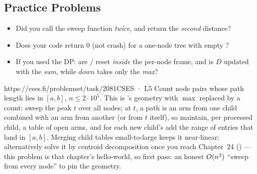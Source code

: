 \subsection{Practice Problems}

\begin{stuckbox}
\begin{itemize}[nosep, leftmargin=1.4em]
  \item Did you call the sweep function \emph{twice}, and return the \emph{second}
        distance?
  \item Does your code return $0$ (not crash) for a one-node tree with empty
        ?
  \item If you used the DP: are / reset \emph{inside} the per-node
        frame, and is $D$ updated with the \emph{sum}, while $\mathit{down}$ takes only
        the \emph{max}?
\end{itemize}
\end{stuckbox}

\begin{practiceset}
    {https://cses.fi/problemset/task/2081}{CSES · L5}
    {Count node pairs whose path length lies in $[a,b]$, $n \le 2\cdot 10^{5}$. This is
    's geometry with $\max$ replaced by a count: sweep the peak $t$
    over all nodes; at $t$, a path is an arm from one child combined with an arm from
    another (or from $t$ itself), so maintain, per processed child, a table
     of open arms, and for each new child's  add the range
    of  entries that land in $[a,b]$. Merging child tables small-to-large
    keeps it near-linear; alternatively solve it by centroid decomposition once you
    reach Chapter~24 () --- this problem is that chapter's hello-world, so
    first pass: an honest $O(n^2)$ ``sweep from every node'' to pin the geometry.}
\end{practiceset}

